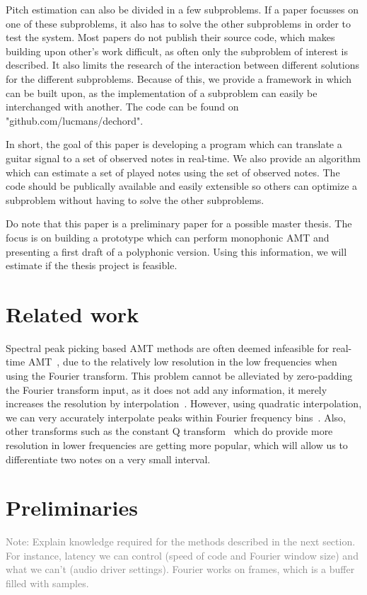 \documentclass[10pt,twocolumn]{article}
\begin{document}
Pitch estimation can also be divided in a few subproblems. If a paper focusses on one of these subproblems, it also has to solve the other subproblems in order to test the system. Most papers do not publish their source code, which makes building upon other's work difficult, as often only the subproblem of interest is described. It also limits the research of the interaction between different solutions for the different subproblems. Because of this, we provide a framework in which can be built upon, as the implementation of a subproblem can easily be interchanged with another. The code can be found on "github.com/lucmans/dechord".

In short, the goal of this paper is developing a program which can translate a guitar signal to a set of observed notes in real-time. We also provide an algorithm which can estimate a set of played notes using the set of observed notes. The code should be publically available and easily extensible so others can optimize a subproblem without having to solve the other subproblems.

Do note that this paper is a preliminary paper for a possible master thesis. The focus is on building a prototype which can perform monophonic AMT and presenting a first draft of a polyphonic version. Using this information, we will estimate if the thesis project is feasible.


\section{Related work}
Spectral peak picking based AMT methods are often deemed infeasible for real-time AMT~\cite{hater}, due to the relatively low resolution in the low frequencies when using the Fourier transform. This problem cannot be alleviated by zero-padding the Fourier transform input, as it does not add any information, it merely increases the resolution by interpolation~\cite{infomax}. However, using quadratic interpolation, we can very accurately interpolate peaks within Fourier frequency bins~\cite{interpol}. Also, other transforms such as the constant Q transform~\cite{cqt} which do provide more resolution in lower frequencies are getting more popular, which will allow us to differentiate two notes on a very small interval.


\section{Preliminaries}
\textcolor{gray}{Note: Explain knowledge required for the methods described in the next section. For instance, latency we can control (speed of code and Fourier window size) and what we can't (audio driver settings). Fourier works on frames, which is a buffer filled with samples.}
\end{document}
